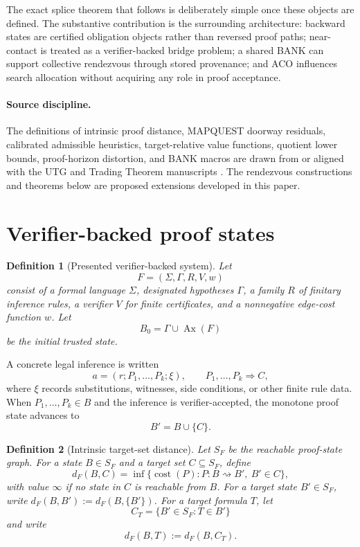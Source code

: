\documentclass[11pt]{article}
\newtheorem{definition}{Definition}[section]
\newcommand{\cost}{\operatorname{cost}}
\begin{document}
The exact splice theorem that follows is deliberately simple once these objects are defined. The substantive contribution is the surrounding architecture: backward states are certified obligation objects rather than reversed proof paths; near-contact is treated as a verifier-backed bridge problem; a shared BANK can support collective rendezvous through stored provenance; and ACO influences search allocation without acquiring any role in proof acceptance.

\paragraph{Source discipline.}
The definitions of intrinsic proof distance, MAPQUEST doorway residuals, calibrated admissible heuristics, target-relative value functions, quotient lower bounds, proof-horizon distortion, and BANK macros are drawn from or aligned with the UTG and Trading Theorem manuscripts \cite{UTGI,UTGII,UTGIII,GLC,Trading}. The rendezvous constructions and theorems below are proposed extensions developed in this paper.

\section{Verifier-backed proof states}

\begin{definition}[Presented verifier-backed system]
Let
\[
F=(\Sigma,\Gamma,R,V,w)
\]
consist of a formal language $\Sigma$, designated hypotheses $\Gamma$, a family $R$ of finitary inference rules, a verifier $V$ for finite certificates, and a nonnegative edge-cost function $w$. Let
\[
B_0=\Gamma\cup\operatorname{Ax}(F)
\]
be the initial trusted state.
\end{definition}

A concrete legal inference is written
\[
a=(r;P_1,\ldots,P_k;\xi),\qquad P_1,\ldots,P_k\Longrightarrow C,
\]
where $\xi$ records substitutions, witnesses, side conditions, or other finite rule data. When $P_1,\ldots,P_k\in B$ and the inference is verifier-accepted, the monotone proof state advances to
\[
B' = B\cup\{C\}.
\]

\begin{definition}[Intrinsic target-set distance]
Let $S_F$ be the reachable proof-state graph. For a state $B\in S_F$ and a target set $C\subseteq S_F$, define
\[
d_F(B,C)=\inf\{\cost(P):P:B\rightsquigarrow B',\ B'\in C\},
\]
with value $\infty$ if no state in $C$ is reachable from $B$. For a target state $B'\in S_F$, write $d_F(B,B'):=d_F(B,\{B'\})$. For a target formula $T$, let
\[
C_T=\{B'\in S_F:T\in B'\}
\]
and write
\[
d_F(B,T):=d_F(B,C_T).
\]
\end{definition}
\end{document}
